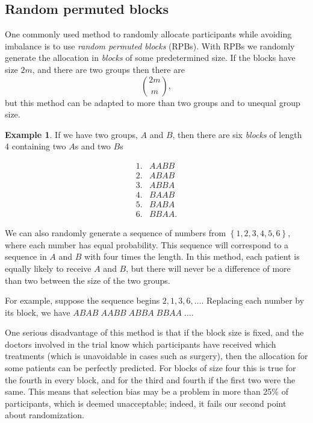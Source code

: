 \documentclass[
  openany]{book}
\theoremstyle{definition}
\theoremstyle{definition}
\newtheorem{example}{Example}[chapter]
\theoremstyle{definition}
\theoremstyle{definition}
\theoremstyle{remark}
\begin{document}
\subsection{Random permuted blocks}\label{random-permuted-blocks}

One commonly used method to randomly allocate participants while avoiding imbalance is to use \emph{random permuted blocks} (RPBs). With RPBs we randomly generate the allocation in \emph{blocks} of some predetermined size. If the blocks have size \(2m\), and there are two groups then there are \[\binom{2m}{m},\] but this method can be adapted to more than two groups and to unequal group size.

\begin{example}
If we have two groups, \(A\) and \(B\), then there are six \emph{blocks} of length 4 containing two \(A\)s and two \(B\)s

\[
\begin{aligned}
1.& AABB\\
2.& ABAB\\
3.& ABBA\\
4.& BAAB\\
5.& BABA\\
6.& BBAA.
\end{aligned}
\]

We can also randomly generate a sequence of numbers from \(\left\lbrace 1, 2, 3, 4, 5, 6 \right\rbrace\), where each number has equal probability. This sequence will correspond to a sequence in \(A\) and \(B\) with four times the length. In this method, each patient is equally likely to receive \(A\) and \(B\), but there will never be a difference of more than two between the size of the two groups.

For example, suppose the sequence begins \(2,1,3,6,\ldots\). Replacing each number by its block, we have \(ABAB\;AABB\;ABBA\;BBAA\;\ldots\).
\end{example}

One serious disadvantage of this method is that if the block size is fixed, and the doctors involved in the trial know which participants have received which treatments (which is unavoidable in cases such as surgery), then the allocation for some patients can be perfectly predicted. For blocks of size four this is true for the fourth in every block, and for the third and fourth if the first two were the same. This means that selection bias may be a problem in more than 25\% of participants, which is deemed unacceptable; indeed, it fails our second point about randomization.
\end{document}
